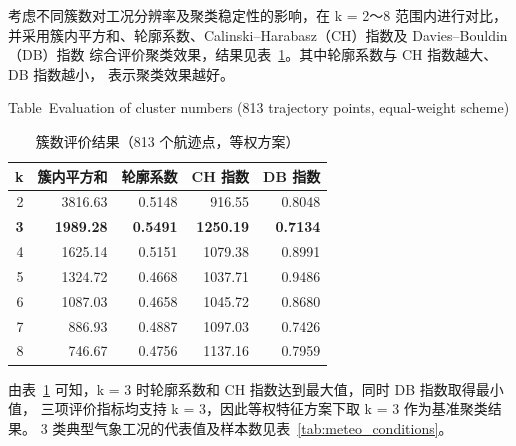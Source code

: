 \documentclass[UTF8,a4paper,twoside,zihao=5,fontset=windows]{ctexart}
\begin{document}
考虑不同簇数对工况分辨率及聚类稳定性的影响，在 k = 2～8 范围内进行对比，
并采用簇内平方和、轮廓系数、Calinski–Harabasz（CH）指数及 Davies–Bouldin（DB）指数
综合评价聚类效果，结果见表~\ref{tab:meteo_cluster_numbers}。其中轮廓系数与 CH 指数越大、DB 指数越小，
表示聚类效果越好。

\begin{table}[htbp]
\centering
\small
\setlength{\tabcolsep}{4pt}
\renewcommand{\arraystretch}{1.4}
\caption{簇数评价结果（813 个航迹点，等权方案）}
{\small Table~\thetable\quad Evaluation of cluster numbers (813 trajectory points, equal-weight scheme)\par}
\smallskip
\label{tab:meteo_cluster_numbers}
\begin{tabular}{@{}rrrrr@{}}
\toprule
k & 簇内平方和 & 轮廓系数 & CH 指数 & DB 指数 \\
\midrule
2 & 3816.63 & 0.5148 & 916.55 & 0.8048 \\
\textbf{3} & \textbf{1989.28} & \textbf{0.5491} & \textbf{1250.19} & \textbf{0.7134} \\
4 & 1625.14 & 0.5151 & 1079.38 & 0.8991 \\
5 & 1324.72 & 0.4668 & 1037.71 & 0.9486 \\
6 & 1087.03 & 0.4658 & 1045.72 & 0.8680 \\
7 & 886.93 & 0.4887 & 1097.03 & 0.7426 \\
8 & 746.67 & 0.4756 & 1137.16 & 0.7959 \\
\bottomrule
\end{tabular}
\end{table}
\FloatBarrier

由表~\ref{tab:meteo_cluster_numbers} 可知，k = 3 时轮廓系数和 CH 指数达到最大值，同时 DB 指数取得最小值，
三项评价指标均支持 k = 3，因此等权特征方案下取 k = 3 作为基准聚类结果。
3 类典型气象工况的代表值及样本数见表~\ref{tab:meteo_conditions}。
\end{document}
